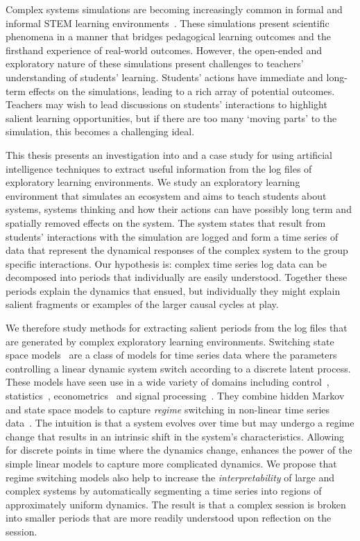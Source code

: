 Complex systems simulations are becoming increasingly common in formal and informal STEM learning environments~\citep{smordal2012hybrid}. These simulations present scientific phenomena in a manner that bridges pedagogical learning outcomes and the firsthand experience of real-world outcomes. However, the open-ended and exploratory nature of these simulations present challenges to teachers' understanding of students' learning. Students' actions have immediate and long-term effects on the simulations, leading to a rich array of potential outcomes. Teachers may wish to lead discussions on students' interactions to highlight salient learning opportunities, but if there are too many `moving parts' to the simulation, this becomes a challenging ideal.

This thesis presents an investigation into and a case study for using artificial intelligence techniques to extract useful information from the log files of exploratory learning environments. We study an exploratory learning environment that simulates an ecosystem and aims to teach students about systems, systems thinking and how their actions can have possibly long term and spatially removed effects on the system. The system states that result from students' interactions with the simulation are logged and form a time series of data that represent the dynamical responses of the complex system to the group specific interactions. Our hypothesis is: complex time series log data can be decomposed into periods that individually are easily understood. Together these periods explain the dynamics that ensued, but individually they might explain salient fragments or examples of the larger causal cycles at play.

We therefore study methods for extracting salient periods from the log files that are generated by complex exploratory learning environments. Switching state space models~\citep{ghahramani2000variational} are a class of models for time series data where the parameters controlling a linear dynamic system switch according to a discrete latent process. These models have seen use in a wide variety of domains including control~\citep{ikoma2002tracking}, statistics~\citep{cappe2009inference}, econometrics~\citep{giordani2007unified} and signal processing~\citep{kim1999state}. They combine hidden Markov and state space models to capture \textit{regime} switching in non-linear time series data~\citep{whiteley2010efficient}. The intuition is that a system evolves over time but may undergo a regime change that results in an intrinsic shift in the system's characteristics. Allowing for discrete points in time where the dynamics change, enhances the power of the simple linear models to capture more complicated dynamics. We propose that regime switching models also help to increase the \textit{interpretability} of large and complex systems by automatically segmenting a time series into regions of approximately uniform dynamics. The result is that a complex session is broken into smaller periods that are more readily understood upon reflection on the session.

